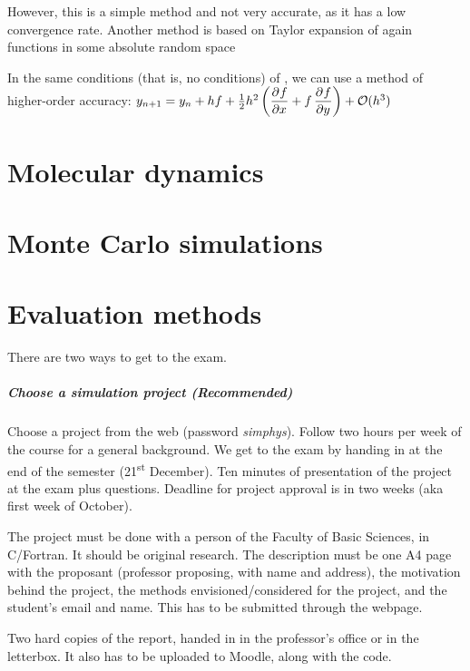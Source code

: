 \documentclass[palatino]{epflnotes}
\begin{document}
However, this is a simple method and not very accurate, as it has a low convergence rate. Another method is based on Taylor expansion of again functions in some absolute random space

\begin{prop} In the same conditions (that is, no conditions) of , we can use a method of higher-order accuracy: \( y_{n+1} = y_n + hf + \frac{1}{2}h^2 \left(\dpd{f}{x} + f \dpd{f}{y}\right) + \mathcal{O}(h^3) \label{eq:TaylorExpansion} \)
\end{prop}

\chapter{Molecular dynamics}

\chapter{Monte Carlo simulations}

\appendix

\chapter{Evaluation methods}

There are two ways to get to the exam.

\paragraph{Choose a simulation project (Recommended)} Choose a project from the web (password \textit{simphys}). Follow two hours per week of the course for a general background. We get to the exam by handing in at the end of the semester (21\textsuperscript{st} December). Ten minutes of presentation of the project at the exam plus questions. Deadline for project approval is in two weeks (aka first week of October).

The project must be done with a person of the Faculty of Basic Sciences, in C/Fortran. It should be original research. The description must be one A4 page with the proposant (professor proposing, with name and address), the motivation behind the project, the methods envisioned/considered for the project, and the student's email and name. This has to be submitted through the webpage.

Two hard copies of the report, handed in in the professor's office or in the letterbox. It also has to be uploaded to Moodle, along with the code.
\end{document}
